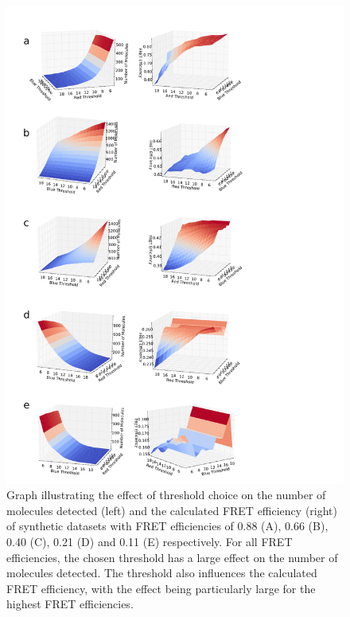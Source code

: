 \begin{figure}
   \begin{center}
      \includegraphics*[width=5.5in]{inference/summary_threshold_E_population.pdf}
      \caption{Graph illustrating the effect of threshold choice on the number of molecules detected (left) and the calculated FRET efficiency (right) of synthetic datasets with FRET efficiencies of 0.88 (A), 0.66 (B), 0.40 (C), 0.21 (D) and 0.11 (E) respectively. For all FRET efficiencies, the chosen threshold has a large effect on the number of molecules detected. The threshold also influences the calculated FRET efficiency, with the effect being particularly large for the highest FRET efficiencies.}
      \label{fig:threshold_effect}
   \end{center}
\end{figure}


